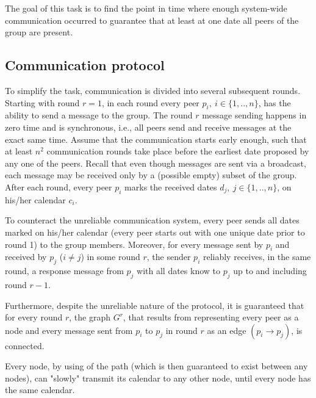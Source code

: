 \documentclass[12pt,a4paper,titlepage,oneside]{article}
\begin{document}
\noindent
The goal of this task is to find the point in time where enough system-wide
communication occurred to guarantee that at least at one date all peers of
the group are present.

\subsection{Communication protocol}
To simplify the task, communication is divided into several subsequent rounds.
Starting with round $r=1$, in each round every peer $p_i,~i \in \{1,..,n\}$,
has the ability to send a message to the group.
The round $r$ message sending happens in zero time and is synchronous, i.e.,
all peers send and receive messages at the exact same time.
Assume that the communication starts early enough, such that at least $n^2$
communication rounds take place before the earliest date proposed by any one
of the peers.
Recall that even though messages are sent via a broadcast, each message may be
received only by a (possible empty) subset of the group.
After each round, every peer $p_i$ marks the received dates $d_j,~j \in
\{1,..,n\}$, on his/her calendar $c_i$.

To counteract the unreliable communication system, every peer sends all
dates marked on his/her calendar (every peer starts out with one unique date
prior to round 1) to the group members.
Moreover, for every message sent by $p_i$ and received by $p_j$ ($i\neq j$) in
some round $r$, the sender $p_i$ reliably receives, in the same round, a response
message from $p_j$ with all dates know to $p_j$ up to and including round
$r-1$.

Furthermore, despite the unreliable nature of the protocol, it is guaranteed
that for every round $r$, the graph $G^r$, that results from representing
every peer as a node and every message sent from $p_i$ to $p_j$ in round $r$
as an edge $(p_i \rightarrow p_j)$, is connected.


Every node, by using of the path (which is then guaranteed to exist between any nodes), can "slowly" transmit its calendar to any other node, until every node has the same calendar.\par
\end{document}
